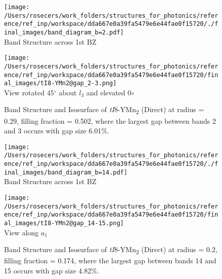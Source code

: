 \begin{figure}[H]
\begin{minipage}{0.5\textwidth}\centering
\texttt{[image: /Users/rosecers/work\_folders/structures\_for\_photonics/reference/ref\_inp/workspace/dda667e0a39fa5479e6e44fae0f15720/./final\_images/band\_diagram\_b=2.pdf]}
\\Band Structure across 1st BZ
\end{minipage}\hfill
\begin{minipage}{0.48\textwidth}\centering
\texttt{[image: /Users/rosecers/work\_folders/structures\_for\_photonics/reference/ref\_inp/workspace/dda667e0a39fa5479e6e44fae0f15720/final\_images/tI8-YMn2@gap\_2-3.png]}
\\View rotated 45$^{\circ}$ about $l_3$  and elevated 0${\circ}$
\end{minipage}\hfill\caption{Band Structure and Isosurface of \textit{tI}8-YMn\textsubscript{2} (Direct) at radius = 0.29, filling fraction = 0.502, where the largest gap between bands 2 and 3 occurs with gap size 6.01\%.}

\end{figure}
\vspace{-0.25in}


\begin{figure}[H]
\begin{minipage}{0.5\textwidth}\centering
\texttt{[image: /Users/rosecers/work\_folders/structures\_for\_photonics/reference/ref\_inp/workspace/dda667e0a39fa5479e6e44fae0f15720/./final\_images/band\_diagram\_b=14.pdf]}
\\Band Structure across 1st BZ
\end{minipage}\hfill
\begin{minipage}{0.48\textwidth}\centering
\texttt{[image: /Users/rosecers/work\_folders/structures\_for\_photonics/reference/ref\_inp/workspace/dda667e0a39fa5479e6e44fae0f15720/final\_images/tI8-YMn2@gap\_14-15.png]}
\\View along $a_1$ 
\end{minipage}\hfill\caption{Band Structure and Isosurface of \textit{tI}8-YMn\textsubscript{2} (Direct) at radius = 0.2, filling fraction = 0.174, where the largest gap between bands 14 and 15 occurs with gap size 4.82\%.}

\end{figure}
\vspace{-0.25in}

